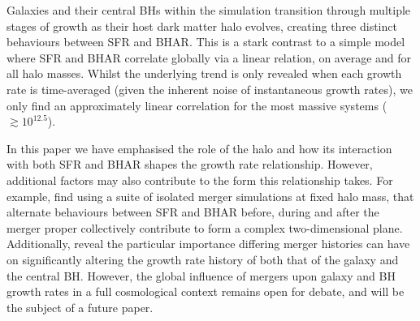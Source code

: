 Galaxies and their central BHs within the \eagle simulation transition through
multiple stages of growth as their host dark matter halo evolves, creating
three distinct behaviours between SFR and BHAR. This is a stark contrast to a
simple model where SFR and BHAR correlate globally via a linear relation, on
average and for all halo masses. Whilst the underlying trend is only revealed
when each growth rate is time-averaged (given the inherent noise of
instantaneous growth rates), we only find an approximately linear correlation
for the most massive systems ( $\gtrsim 10^{12.5}$\Msol).

In this paper we have emphasised the role of the halo and how its interaction
with both SFR and BHAR shapes the growth rate relationship.  However,
additional factors may also contribute to the form this relationship takes. For
example, \citet{Volonteri2015b} find using a suite of isolated merger
simulations at fixed halo mass, that alternate behaviours between SFR and BHAR
before, during and after the merger proper collectively contribute to form a
complex two-dimensional plane.  Additionally, \citet{Pontzen2017} reveal the
particular importance differing merger histories can have on significantly
altering the growth rate history of both that of the galaxy and the central BH.
However, the global influence of mergers upon galaxy and BH growth rates in a
full cosmological context remains open for debate, and will be the subject of a
future paper. 

